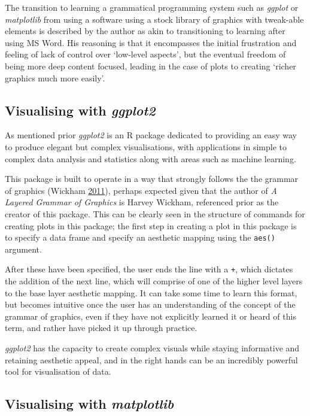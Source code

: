 \documentclass[
  11pt,
]{book}
\begin{document}
The transition to learning a grammatical programming system such as
\textit{ggplot} or \textit{matplotlib} from using a software using a
stock library of graphics with tweak-able elements is described by the
author as akin to transitioning to learning \latex after using MS Word.
His reasoning is that it encompasses the initial frustration and feeling
of lack of control over `low-level aspects', but the eventual freedom of
being more deep content focused, leading in the case of plots to
creating `richer graphics much more easily'.

\subsection{Visualising with \textit{ggplot2}}

As mentioned prior \textit{ggplot2} is an R package dedicated to
providing an easy way to produce elegant but complex visualisations,
with applications in simple to complex data analysis and statistics
along with areas such as machine learning.

This package is built to operate in a way that strongly follows the the
grammar of graphics (Wickham \protect\hyperlink{ref-ggplot2}{2011}),
perhaps expected given that the author of
\textit{A Layered Grammar of Graphics} is Harvey Wickham, referenced
prior as the creator of this package. This can be clearly seen in the
structure of commands for creating plots in this package; the first step
in creating a plot in this package is to specify a data frame and
specify an aesthetic mapping using the \texttt{aes()} argument.

After these have been specified, the user ends the line with a
\texttt{+}, which dictates the addition of the next line, which will
comprise of one of the higher level layers to the base layer aesthetic
mapping. It can take some time to learn this format, but becomes
intuitive once the user has an understanding of the concept of the
grammar of graphics, even if they have not explicitly learned it or
heard of this term, and rather have picked it up through practice.

\textit{ggplot2} has the capacity to create complex visuals while
staying informative and retaining aesthetic appeal, and in the right
hands can be an incredibly powerful tool for visualisation of data.

\subsection{Visualising with \textit{matplotlib}}
\end{document}
